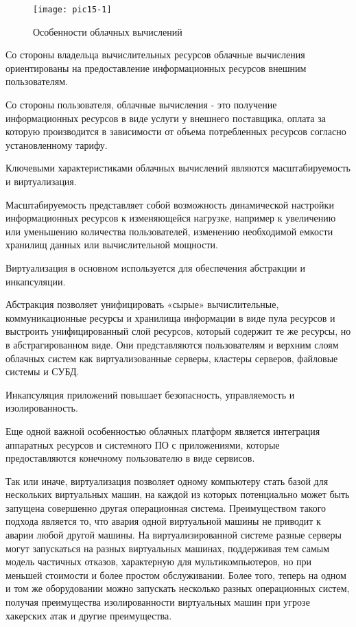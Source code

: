 \begin{figure}
  \begin{center}
  \texttt{[image: pic15-1]}
  \caption{Особенности облачных вычислений}
  \end{center}
  \end{figure}

  Со стороны владельца вычислительных ресурсов облачные вычисления ориентированы на предоставление информационных ресурсов внешним пользователям.

  Со стороны пользователя, облачные вычисления - это получение информационных ресурсов в виде услуги у внешнего поставщика, оплата за которую производится в зависимости от объема потребленных ресурсов согласно установленному тарифу.

  Ключевыми характеристиками облачных вычислений являются масштабируемость и виртуализация.

  Масштабируемость представляет собой возможность динамической настройки информационных ресурсов к изменяющейся нагрузке, например к увеличению или уменьшению количества пользователей, изменению необходимой емкости хранилищ данных или вычислительной мощности.

  Виртуализация в основном используется для обеспечения абстракции и инкапсуляции.

  Абстракция позволяет унифицировать «сырые» вычислительные, коммуникационные ресурсы и хранилища информации в виде пула ресурсов и выстроить унифицированный слой ресурсов, который содержит те же ресурсы, но в абстрагированном виде. Они представляются пользователям и верхним слоям облачных систем как виртуализованные серверы, кластеры серверов, файловые системы и СУБД.

  Инкапсуляция приложений повышает безопасность, управляемость и изолированность.

  Еще одной важной особенностью облачных платформ является интеграция аппаратных ресурсов и системного ПО с приложениями, которые предоставляются конечному пользователю в виде сервисов. 

  Так или иначе, виртуализация позволяет одному компьютеру стать базой для нескольких виртуальных машин, на каждой из которых потенциально может быть запущена совершенно другая операционная система. Преимуществом такого подхода является то, что авария одной виртуальной машины не приводит к аварии любой другой машины. На виртуализированной системе разные серверы могут запускаться на разных виртуальных машинах, поддерживая тем самым модель частичных отказов, характерную для мультикомпьютеров, но при меньшей стоимости и более простом обслуживании. Более того, теперь на одном и том же оборудовании можно запускать несколько разных операционных систем, получая преимущества изолированности виртуальных машин при угрозе хакерских атак и другие преимущества.

